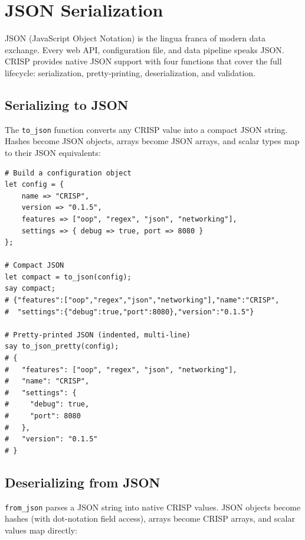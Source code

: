 \section{JSON Serialization}

JSON (JavaScript Object Notation) is the lingua franca of modern data exchange. Every web API, configuration file, and data pipeline speaks JSON. CRISP provides native JSON support with four functions that cover the full lifecycle: serialization, pretty-printing, deserialization, and validation.

\subsection{Serializing to JSON}

The \texttt{to\_json} function converts any CRISP value into a compact JSON string. Hashes become JSON objects, arrays become JSON arrays, and scalar types map to their JSON equivalents:

\begin{tcolorbox}[colback=codebg, colframe=darkpurple, colbacktitle=darkpurple, title=\textbf{\textcolor{codegold}{JSON Serialization}}, fonttitle=\bfseries, sharp corners]
\begin{lstlisting}
# Build a configuration object
let config = {
    name => "CRISP",
    version => "0.1.5",
    features => ["oop", "regex", "json", "networking"],
    settings => { debug => true, port => 8080 }
};

# Compact JSON
let compact = to_json(config);
say compact;
# {"features":["oop","regex","json","networking"],"name":"CRISP",
#  "settings":{"debug":true,"port":8080},"version":"0.1.5"}

# Pretty-printed JSON (indented, multi-line)
say to_json_pretty(config);
# {
#   "features": ["oop", "regex", "json", "networking"],
#   "name": "CRISP",
#   "settings": {
#     "debug": true,
#     "port": 8080
#   },
#   "version": "0.1.5"
# }
\end{lstlisting}
\end{tcolorbox}

\clearpage
\subsection{Deserializing from JSON}

\texttt{from\_json} parses a JSON string into native CRISP values. JSON objects become hashes (with dot-notation field access), arrays become CRISP arrays, and scalar values map directly:

